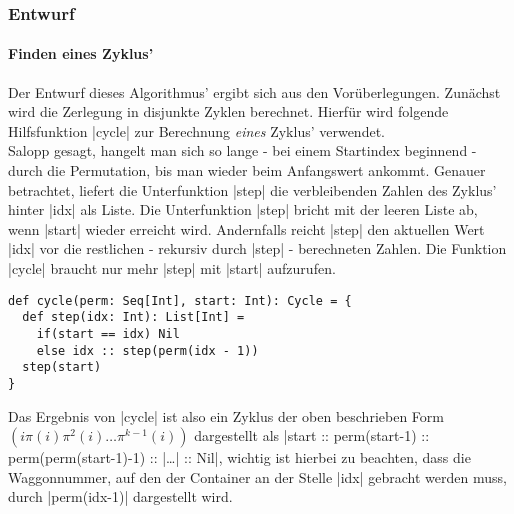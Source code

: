 \subsubsection{Entwurf}
\label{slow_cycler}
\paragraph{Finden eines Zyklus'}
Der Entwurf dieses Algorithmus' ergibt sich aus den Vorüberlegungen. Zunächst wird die Zerlegung in disjunkte Zyklen berechnet.
Hierfür wird folgende Hilfsfunktion |cycle| zur Berechnung \emph{eines} Zyklus' verwendet.\\
Salopp gesagt, hangelt man sich so lange - bei einem Startindex beginnend - durch die Permutation, bis man wieder beim Anfangswert ankommt.
Genauer betrachtet, liefert die Unterfunktion |step| die verbleibenden Zahlen des Zyklus' hinter |idx| als Liste.
Die Unterfunktion |step| bricht mit der leeren Liste ab, wenn |start| wieder erreicht wird.
Andernfalls reicht |step| den aktuellen Wert |idx| vor die restlichen - rekursiv durch |step| - berechneten Zahlen.
Die Funktion |cycle| braucht nur mehr |step| mit |start| aufzurufen.
\lstset{basicstyle=\ttfamily}
\begin{lstlisting}
def cycle(perm: Seq[Int], start: Int): Cycle = {
  def step(idx: Int): List[Int] =
    if(start == idx) Nil
    else idx :: step(perm(idx - 1))
  step(start)
}
\end{lstlisting}
Das Ergebnis von |cycle| ist also ein Zyklus der oben beschrieben Form $(i \pi(i) \pi^2(i) \dots \pi^{k-1}(i))$ dargestellt
als |start :: perm(start-1) :: perm(perm(start-1)-1) :: |\dots| :: Nil|,
wichtig ist hierbei zu beachten, dass die Waggonnummer, auf den der Container an der Stelle |idx| gebracht werden muss,
 durch |perm(idx-1)| dargestellt wird.
